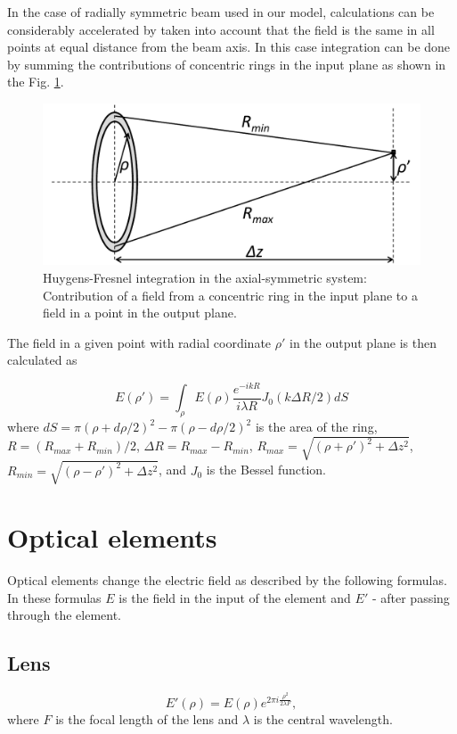 \documentclass{report}
\begin{document}
In the case of radially symmetric beam used in our model, calculations can be considerably accelerated by taken into account that the field is the same in all points at equal distance from the beam axis. In this case integration can be done by summing the contributions of concentric rings in the input plane as shown in the Fig. \ref{fig:Huygens-Fresnel}.

\begin{figure}[ht]
\centering
\includegraphics[width=120mm]{images/huygens-fresnel}
\caption{Huygens-Fresnel integration in the axial-symmetric system: Contribution of a field from a concentric ring in the input plane to a field in a point in the output plane.}\label{fig:Huygens-Fresnel}
\end{figure}

The field in a given point with radial coordinate $\rho'$ in the output plane is then calculated as

\begin{equation}
E(\rho') = \int_{\rho}E(\rho)\frac{e^{-ikR}}{i\lambda R} J_0(k\Delta R/2) dS
\end{equation}
where $dS = \pi(\rho+d\rho/2)^2-\pi(\rho-d\rho/2)^2$ is the area of the ring, $R=(R_{max}+R_{min})/2$, $\Delta R=R_{max}-R_{min}$, $R_{max}=\sqrt{(\rho+\rho')^2+\Delta z^2}$, $R_{min}=\sqrt{(\rho-\rho')^2+\Delta z^2}$, and $J_0$ is the Bessel function.


\section{Optical elements}
Optical elements change the electric field as described by the following formulas. In these formulas $E$ is the field in the input of the element and $E'$ - after passing through the element.

\subsection{Lens}
\begin{equation}
E'(\rho) = E(\rho) e^{2\pi i \frac{\rho^2}{2 \lambda F}},
\end{equation}
where $F$ is the focal length of the lens and $\lambda$ is the central wavelength.
\end{document}

